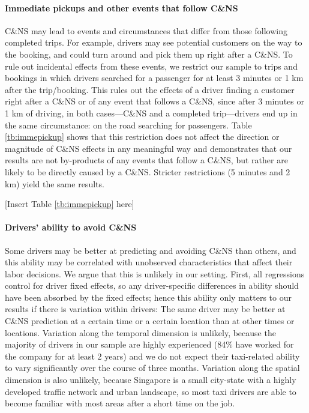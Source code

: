 \documentclass[reviewmode]{restat}
\begin{document}
\paragraph{Immediate pickups and other events that follow C\&NS} C\&NS may lead to events and circumstances 
that differ from those following completed trips. For example, drivers may see potential customers on the way
to the booking, and could turn around and pick them up right after a C\&NS. 
To rule out incidental effects from these events, we restrict our sample to trips and bookings in which 
drivers searched for a passenger for at least 3 minutes or 1 km after the trip/booking. This rules out the
effects of a driver finding a customer right after a C\&NS or of any event that follows a C\&NS, since after
3 minutes or 1 km of driving, in both cases---C\&NS and a completed trip---drivers end up in the same 
circumstance: on the road searching for passengers. Table \ref{tb:immepickup} shows that this restriction 
does not affect the direction or magnitude of C\&NS effects in any meaningful way and demonstrates that our
results are not by-products of any events that follow a C\&NS, but rather are likely to be directly caused 
by a C\&NS. Stricter restrictions (5 minutes and 2 km) yield the same results.

\begin{center}
    [Insert Table \ref{tb:immepickup} here]
\end{center}

\paragraph{Drivers' ability to avoid C\&NS} Some drivers may be better at predicting and avoiding C\&NS 
than others, and this ability may be correlated with unobserved characteristics that affect their labor 
decisions. We argue that this is unlikely in our setting. First, all regressions control for driver fixed
effects, so any driver-specific differences in ability should have been absorbed by the fixed effects;
hence this ability only matters to our results if there is variation within drivers: The same driver may 
be better at C\&NS prediction at a certain time or a certain location than at other times or locations. 
Variation along the temporal dimension is unlikely, because the majority of drivers in our sample are highly
experienced (84\% have worked for the company for at least 2 years) and we do not expect their taxi-related
ability to vary significantly over the course of three months. Variation along the spatial dimension is also
unlikely, because Singapore is a small city-state with a highly developed traffic network and urban landscape,
so most taxi drivers are able to become familiar with most areas after a short time on the job. 
\end{document}
